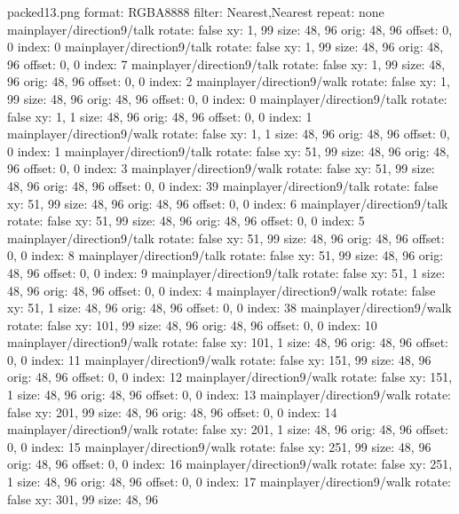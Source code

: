 packed13.png
format: RGBA8888
filter: Nearest,Nearest
repeat: none
mainplayer/direction9/talk
  rotate: false
  xy: 1, 99
  size: 48, 96
  orig: 48, 96
  offset: 0, 0
  index: 0
mainplayer/direction9/talk
  rotate: false
  xy: 1, 99
  size: 48, 96
  orig: 48, 96
  offset: 0, 0
  index: 7
mainplayer/direction9/talk
  rotate: false
  xy: 1, 99
  size: 48, 96
  orig: 48, 96
  offset: 0, 0
  index: 2
mainplayer/direction9/walk
  rotate: false
  xy: 1, 99
  size: 48, 96
  orig: 48, 96
  offset: 0, 0
  index: 0
mainplayer/direction9/talk
  rotate: false
  xy: 1, 1
  size: 48, 96
  orig: 48, 96
  offset: 0, 0
  index: 1
mainplayer/direction9/walk
  rotate: false
  xy: 1, 1
  size: 48, 96
  orig: 48, 96
  offset: 0, 0
  index: 1
mainplayer/direction9/talk
  rotate: false
  xy: 51, 99
  size: 48, 96
  orig: 48, 96
  offset: 0, 0
  index: 3
mainplayer/direction9/walk
  rotate: false
  xy: 51, 99
  size: 48, 96
  orig: 48, 96
  offset: 0, 0
  index: 39
mainplayer/direction9/talk
  rotate: false
  xy: 51, 99
  size: 48, 96
  orig: 48, 96
  offset: 0, 0
  index: 6
mainplayer/direction9/talk
  rotate: false
  xy: 51, 99
  size: 48, 96
  orig: 48, 96
  offset: 0, 0
  index: 5
mainplayer/direction9/talk
  rotate: false
  xy: 51, 99
  size: 48, 96
  orig: 48, 96
  offset: 0, 0
  index: 8
mainplayer/direction9/talk
  rotate: false
  xy: 51, 99
  size: 48, 96
  orig: 48, 96
  offset: 0, 0
  index: 9
mainplayer/direction9/talk
  rotate: false
  xy: 51, 1
  size: 48, 96
  orig: 48, 96
  offset: 0, 0
  index: 4
mainplayer/direction9/walk
  rotate: false
  xy: 51, 1
  size: 48, 96
  orig: 48, 96
  offset: 0, 0
  index: 38
mainplayer/direction9/walk
  rotate: false
  xy: 101, 99
  size: 48, 96
  orig: 48, 96
  offset: 0, 0
  index: 10
mainplayer/direction9/walk
  rotate: false
  xy: 101, 1
  size: 48, 96
  orig: 48, 96
  offset: 0, 0
  index: 11
mainplayer/direction9/walk
  rotate: false
  xy: 151, 99
  size: 48, 96
  orig: 48, 96
  offset: 0, 0
  index: 12
mainplayer/direction9/walk
  rotate: false
  xy: 151, 1
  size: 48, 96
  orig: 48, 96
  offset: 0, 0
  index: 13
mainplayer/direction9/walk
  rotate: false
  xy: 201, 99
  size: 48, 96
  orig: 48, 96
  offset: 0, 0
  index: 14
mainplayer/direction9/walk
  rotate: false
  xy: 201, 1
  size: 48, 96
  orig: 48, 96
  offset: 0, 0
  index: 15
mainplayer/direction9/walk
  rotate: false
  xy: 251, 99
  size: 48, 96
  orig: 48, 96
  offset: 0, 0
  index: 16
mainplayer/direction9/walk
  rotate: false
  xy: 251, 1
  size: 48, 96
  orig: 48, 96
  offset: 0, 0
  index: 17
mainplayer/direction9/walk
  rotate: false
  xy: 301, 99
  size: 48, 96
